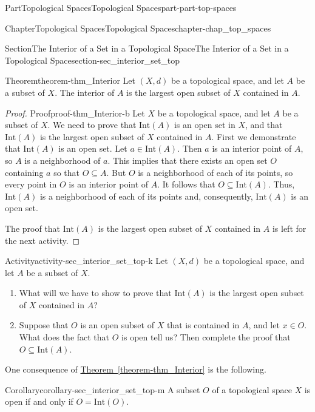 \documentclass[oneside,10pt,]{book}
\newcommand{\xreffont}{\relax}
\numberwithin{equation}{chapter}
\newcommand{\Int}{\text{Int}}
\begin{document}
\begin{partptx}{Part}{Topological Spaces}{}{Topological Spaces}{}{}{part-part-top-spaces}
\begin{chapterptx}{Chapter}{Topological Spaces}{}{Topological Spaces}{}{}{chapter-chap_top_spaces}
\begin{sectionptx}{Section}{The Interior of a Set in a Topological Space}{}{The Interior of a Set in a Topological Space}{}{}{section-sec_interior_set_top}
\begin{theorem}{Theorem}{}{}{theorem-thm_Interior}%
Let \((X,d)\) be a topological space, and let \(A\) be a subset of \(X\). The interior of \(A\) is the largest open subset of \(X\) contained in \(A\).%
\end{theorem}
\begin{proof}{Proof}{}{proof-thm_Interior-b}
Let \(X\) be a topological space, and let \(A\) be a subset of \(X\). We need to prove that \(\Int(A)\) is an open set in \(X\), and that \(\Int(A)\) is the largest open subset of \(X\) contained in \(A\). First we demonstrate that \(\Int(A)\) is an open set. Let \(a \in \Int(A)\). Then \(a\) is an interior point of \(A\), so \(A\) is a neighborhood of \(a\). This implies that there exists an open set \(O\) containing \(a\) so that \(O \subseteq A\). But \(O\) is a neighborhood of each of its points, so every point in \(O\) is an interior point of \(A\). It follows that \(O \subseteq \Int(A)\). Thus, \(\Int(A)\) is a neighborhood of each of its points and, consequently, \(\Int(A)\) is an open set.%
\par
The proof that \(\Int(A)\) is the largest open subset of \(X\) contained in \(A\) is left for the next activity.%
\end{proof}
\begin{activity}{Activity}{}{activity-sec_interior_set_top-k}%
Let \((X,d)\) be a topological space, and let \(A\) be a subset of \(X\).%
\begin{enumerate}[font=\bfseries,label=(\alph*),ref=\alph*]%
\item{}What will we have to show to prove that \(\Int(A)\) is the largest open subset of \(X\) contained in \(A\)?%
\item{}Suppose that \(O\) is an open subset of \(X\) that is contained in \(A\), and let \(x \in O\). What does the fact that \(O\) is open tell us? Then complete the proof that \(O \subseteq \Int(A)\).%
\end{enumerate}%
\end{activity}%
One consequence of \hyperref[theorem-thm_Interior]{Theorem~{\xreffont\ref{theorem-thm_Interior}}} is the following.%
\begin{corollary}{Corollary}{}{}{corollary-sec_interior_set_top-m}%
A subset \(O\) of a topological space \(X\) is open if and only if \(O = \Int(O)\).%
\end{corollary}
\end{sectionptx}
%
%
\typeout{************************************************}

\end{chapterptx}
\end{partptx}
\end{document}
